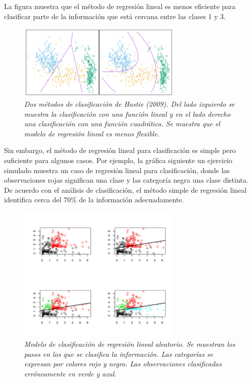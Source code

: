 \documentclass[letterpaper,12pt, spanish, oneside]{book} %
\begin{document}
La figura muestra que el método de regresión lineal es menos eficiente para clasificar parte de la información que está cercana entre las clases 1 y 3. 

\begin{figure}[H]
\centering
\includegraphics[width=0.7\textwidth]{ng.png}
\caption{\label{fig:frog2}\textit{Dos métodos de clasificación de Hastie (2009). Del lado izquierdo se muestra la clasificación con una función lineal y en el lado derecho una clasificación con una función cuadrática. Se muestra que el modelo de regresión lineal es menos flexible}.}
\end{figure}

Sin embargo, el método de regresión lineal para clasificación es simple pero suficiente para algunos casos. Por ejemplo, la gráfica siguiente un ejercicio simulado muestra un caso de regresión lineal para clasificación, donde las observaciones rojas significan una clase y las categoría negra una clase distinta. De acuerdo con el análisis de clasificación, el método simple de regresión lineal identifica cerca del 70\% de la información adecuadamente. 

\begin{figure}[H]
\centering
\includegraphics[width=0.7\textwidth]{clasificadorlineal.png}
\caption{\label{fig:frog2}\textit{Modelo de clasificación de regresión lineal aleatorio. Se muestran los pasos en los que se clasifica la información. Las categorías se expresan por colores rojo y negro. Las observaciones clasificadas erróneamente en verde y azul}.}
\end{figure}
\end{document}
